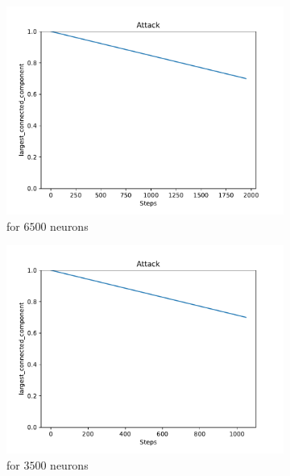 \begin{figure}
\begin{subfigure}[b]{0.45\textwidth}
		\centering
		\includegraphics[width=\textwidth]{Images/plots_rnd/rnd_28.pdf}
		\caption{for $6500$ neurons}
	\end{subfigure}
	\hfill
	\begin{subfigure}[b]{0.45\textwidth}
		\centering
		\includegraphics[width=\textwidth]{Images/plots_rnd/rnd_34.pdf}
		\caption{for $3500$ neurons}
	\end{subfigure}
	\\ \vspace{5mm}
	\begin{subfigure}[b]{0.45\textwidth}
		\centering

\end{subfigure}
\end{figure}
